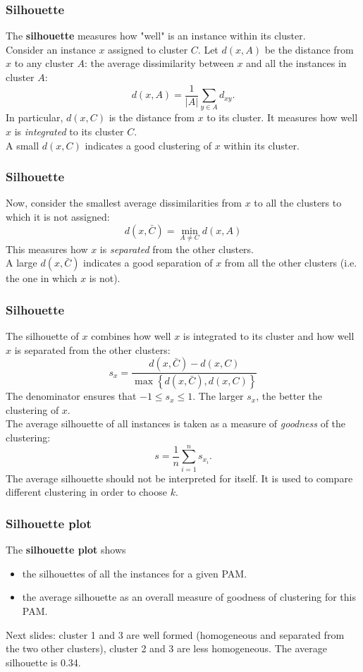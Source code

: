 \begin{frame}
\frametitle{Silhouette}
The {\bf silhouette} measures how "well" is an instance within its cluster. \\
\vspace{0.3cm}
Consider an instance $x$ assigned to cluster $C$. Let $d(x,A)$ be the distance from $x$ to any cluster $A$: the average dissimilarity between $x$ and all the instances in cluster $A$:
$$
d(x,A) = \frac{1}{|A|} \sum_{y\in A} d_{xy}.
$$ 
In particular, $d(x, C)$ is the distance from $x$ to its cluster. It measures how well $x$ is {\it integrated} to its cluster $C$.\\
\vspace{0.3cm}
A small $d(x,C)$ indicates a good clustering of $x$ within its cluster.
\end{frame}
\begin{frame}
\frametitle{Silhouette}
Now, consider the smallest average dissimilarities from $x$ to all the clusters to which it is not assigned:
$$
d(x,\bar{C}) = \min_{A\neq C} d(x, A) 
$$
This measures how $x$ is {\it separated} from the other clusters.\\
\vspace{0.3cm} 
A large $d(x,\bar{C})$ indicates a good separation of $x$ from all the other clusters (i.e. the one in which $x$ is not).
\end{frame}
\begin{frame}
\frametitle{Silhouette}
The silhouette of $x$ combines how well $x$ is integrated to its cluster and how well $x$ is separated from the other clusters:
$$
s_x=\frac{d(x,\bar{C})-d(x,C)}{\max\left\{d(x,\bar{C}),d(x,C)\right\}}
$$
The denominator ensures that $-1\leq s_x\leq 1$. The larger $s_x$, the better the clustering of $x$.\\
\vspace{0.3cm}
The average silhouette of all instances is taken as a measure of {\it goodness} of the clustering:
$$
s = \frac{1}{n}\sum_{i=1}^n s_{x_i}.
$$
The average silhouette should not be interpreted for itself. It is used to compare different clustering in order to choose $k$.
\end{frame}
\begin{frame}
\frametitle{Silhouette plot}
The {\bf silhouette plot} shows 
\begin{itemize}
\item the silhouettes of all the instances for a given PAM.
\item the average silhouette as an overall measure of goodness of clustering for this PAM. 
\end{itemize}
Next slides: cluster 1 and 3 are well formed (homogeneous and separated from the two other clusters), cluster 2 and 3 are less homogeneous. The average silhouette is 0.34. 
\end{frame}
